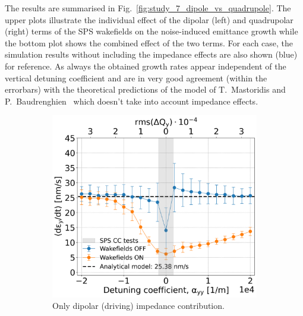 The results are summarised in Fig.~\ref{fig:study_7_dipole_vs_quadrupole}. The upper plots illustrate the individual effect of the dipolar (left) and quadrupolar (right) terms of the SPS wakefields on the noise-induced emittance growth while the bottom plot shows the combined effect of the two terms. For each case, the simulation results without including the impedance effects are also shown (blue) for reference. As always the obtained growth rates appear independent of the vertical detuning coefficient and are in very good agreement (within the errorbars) with the theoretical predictions of the model of T.~Mastoridis and P.~Baudrenghien~\cite{PhysRevSTAB.18.101001} which doesn't take into account impedance effects.

\begin{figure}[htp]
    \centering
    \begin{subfigure}{.45\textwidth}
        \centering
        \includegraphics[width=.95\linewidth]{images/Ch7/dipolar_impedance.png}  
        \caption{Only dipolar (driving) impedance contribution.}
        \label{fig:study_7_dipole}
    \end{subfigure}
    \begin{subfigure}{.45\textwidth}
        \centering

\end{subfigure}
\end{figure}
